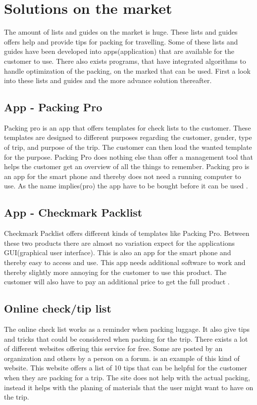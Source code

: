 \section{Solutions on the market}

The amount of lists and guides on the market is huge. These lists and guides offers help and provide tips for packing for travelling. Some of these lists and guides have been developed into apps(application) that are available for the customer to use.
There also exists programs, that have integrated algorithms to handle optimization of the packing, on the marked that can be used.
First a look into these lists and guides and the more advance solution thereafter.

\subsection*{App - Packing Pro}

Packing pro is an app that offers templates for check lists to the customer. These templates are designed to different purposes regarding the customer, gender, type of trip, and purpose of the trip.
The customer can then load the wanted template for the purpose. Packing Pro does nothing else than offer a management tool that helps the customer get an overview of all the things to remember. Packing pro is an app for the smart phone and thereby does not need a running computer to use. As the name implies(pro) the app have to be bought before it can be used \citep{packingpro}.

\subsection*{App - Checkmark Packlist}

Checkmark Packlist offers different kinds of templates like Packing Pro. Between these two products there are almost no variation expect for the applications GUI(graphical user interface). This is also an app for the smart phone and thereby easy to access and use.
This app needs additional software to work and thereby slightly more annoying for the customer to use this product. The customer will also have to pay an additional price to get the full product \citep{checkpacklist}.

\subsection*{Online check/tip list}
The online check list works as a reminder when packing luggage. It also give tips and tricks that could be considered when packing for the trip. There exists a lot of different websites offering this service for free. Some are posted by an organization and others by a person on a forum.
\citep{onlinecheck} is an example of this kind of website. This website offers a list of 10 tips that can be helpful for the customer when they are packing for a trip. The site does not help with the actual packing, instead it helps with the planing of materials that the user might want to have on the trip.

